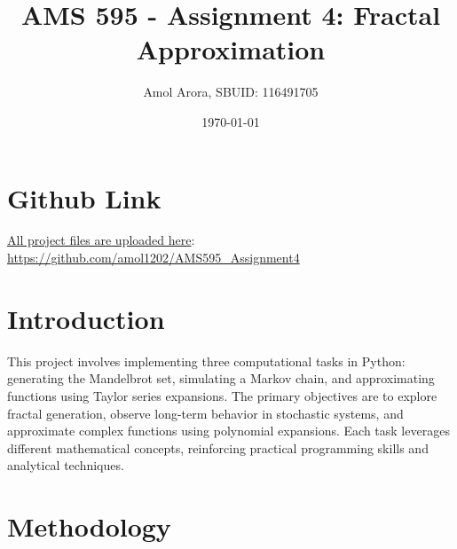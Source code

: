 \documentclass{article}
\title{AMS 595 - Assignment 4: \textbf{Fractal Approximation}}
\author{Amol Arora, SBUID: 116491705}
\date{\today}
\begin{document}
\maketitle

\section{Github Link}
\underline{All project files are uploaded here}:
\url{https://github.com/amol1202/AMS595_Assignment4}

\section{Introduction}
This project involves implementing three computational tasks in Python: generating the Mandelbrot set, simulating a Markov chain, and approximating functions using Taylor series expansions. The primary objectives are to explore fractal generation, observe long-term behavior in stochastic systems, and approximate complex functions using polynomial expansions. Each task leverages different mathematical concepts, reinforcing practical programming skills and analytical techniques.

\section{Methodology}
\end{document}
